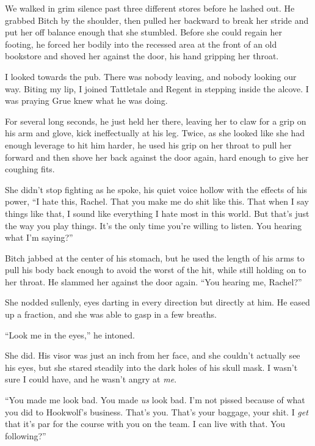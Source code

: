 We walked in grim silence past three different stores before he lashed out.  He grabbed Bitch by the shoulder, then pulled her backward to break her stride and put her off balance enough that she stumbled.  Before she could regain her footing, he forced her bodily into the recessed area at the front of an old bookstore and shoved her against the door, his hand gripping her throat.



I looked towards the pub.  There was nobody leaving, and nobody looking our way.  Biting my lip, I joined Tattletale and Regent in stepping inside the alcove.  I was praying Grue knew what he was doing.



For several long seconds, he just held her there, leaving her to claw for a grip on his arm and glove, kick ineffectually at his leg.  Twice, as she looked like she had enough leverage to hit him harder, he used his grip on her throat to pull her forward and then shove her back against the door again, hard enough to give her coughing fits.



She didn't stop fighting as he spoke, his quiet voice hollow with the effects of his power, ``I hate this, Rachel.  That you make me do shit like this.  That when I say things like that, I sound like everything I hate most in this world.  But that's just the way you play things.  It's the only time you're willing to listen.  You hearing what I'm saying?''



Bitch jabbed at the center of his stomach, but he used the length of his arms to pull his body back enough to avoid the worst of the hit, while still holding on to her throat.  He slammed her against the door again.  ``You hearing me, Rachel?''



She nodded sullenly, eyes darting in every direction but directly at him.  He eased up a fraction, and she was able to gasp in a few breaths.



``Look me in the eyes,'' he intoned.



She did.  His visor was just an inch from her face, and she couldn't actually see his eyes, but she stared steadily into the dark holes of his skull mask.  I wasn't sure I could have, and he wasn't angry at \emph{me}.



``You made me look bad.  You made \emph{us} look bad.  I'm not pissed because of what you did to Hookwolf's business.  That's you.  That's your baggage, your shit.  I \emph{get} that it's par for the course with you on the team.  I can live with that.  You following?''




